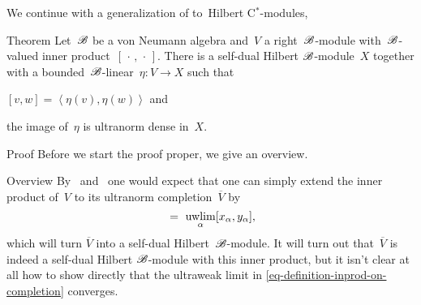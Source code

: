 \documentclass[b]{subfiles}
\begin{document}
\begin{parsec}%
\begin{point}%
We continue with a generalization of
to~Hilbert C$^*$-modules,

\end{point}
\begin{point}{Theorem}%
Let~$\mathscr{B}$ be a von Neumann algebra
and~$V$ a right~$\mathscr{B}$-module with~$\mathscr{B}$-valued
    inner product~$[\,\cdot\,,\,\cdot\,]$.
There is a self-dual Hilbert $\mathscr{B}$-module~$X$
    together with a bounded~$\mathscr{B}$-linear~$\eta\colon V \to X$
    such that \begin{inparaenum}
    \item $[v,w] = \left<\eta (v),\eta(w)\right>$
    and \item the image of~$\eta$ is ultranorm dense in~$X$.
    \end{inparaenum}
\begin{point}{Proof}%
Before we start the proof proper,
    we give an overview.
\begin{point}{Overview}
By~ and~
    one would expect that
    one can simply extend the inner product of~$V$
    to its ultranorm completion~$\overline{V}$
    by
    \begin{equation}
        [(x_\alpha)_\alpha, (y_\alpha)_\alpha] \ =\  \uwlim_\alpha [x_\alpha,y_\alpha], \label{eq-definition-inprod-on-completion}
    \end{equation}
    which will turn $\overline{V}$ into a self-dual Hilbert~$\mathscr{B}$-module.
It will turn out that~$\overline{V}$
    is indeed a self-dual Hilbert $\mathscr{B}$-module
    with this inner product,
    but it isn't clear at all  how to show directly that the ultraweak limit
    in \eqref{eq-definition-inprod-on-completion} converges.


\end{point}
\end{point}
\end{point}
\end{parsec}
\end{document}
